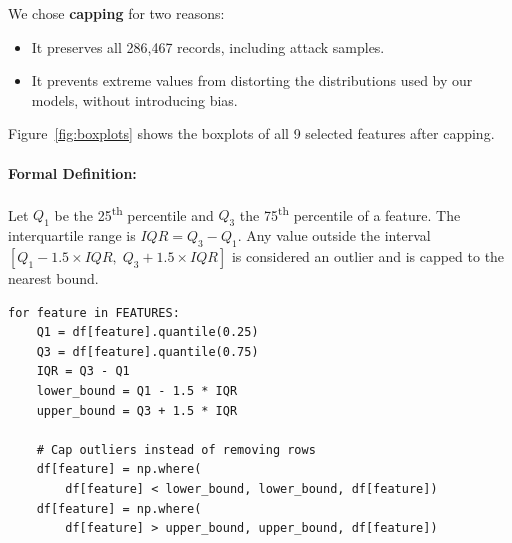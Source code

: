\documentclass[12pt,a4paper]{report}
\begin{document}
We chose \textbf{capping} for two reasons:
\begin{itemize}
    \item It preserves all 286,467 records, including attack samples.
    \item It prevents extreme values from distorting the distributions used by our models, without introducing bias.
\end{itemize}

Figure~\ref{fig:boxplots} shows the boxplots of all 9 selected features after capping.

\paragraph{Formal Definition:} Let $Q_1$ be the 25\textsuperscript{th} percentile and $Q_3$ the 75\textsuperscript{th} percentile of a feature. The interquartile range is $IQR = Q_3 - Q_1$. Any value outside the interval $[Q_1 - 1.5 \times IQR,\; Q_3 + 1.5 \times IQR]$ is considered an outlier and is capped to the nearest bound.

\begin{lstlisting}[caption={Outlier capping using the IQR method}]
for feature in FEATURES:
    Q1 = df[feature].quantile(0.25)
    Q3 = df[feature].quantile(0.75)
    IQR = Q3 - Q1
    lower_bound = Q1 - 1.5 * IQR
    upper_bound = Q3 + 1.5 * IQR

    # Cap outliers instead of removing rows
    df[feature] = np.where(
        df[feature] < lower_bound, lower_bound, df[feature])
    df[feature] = np.where(
        df[feature] > upper_bound, upper_bound, df[feature])
\end{lstlisting}
\end{document}
